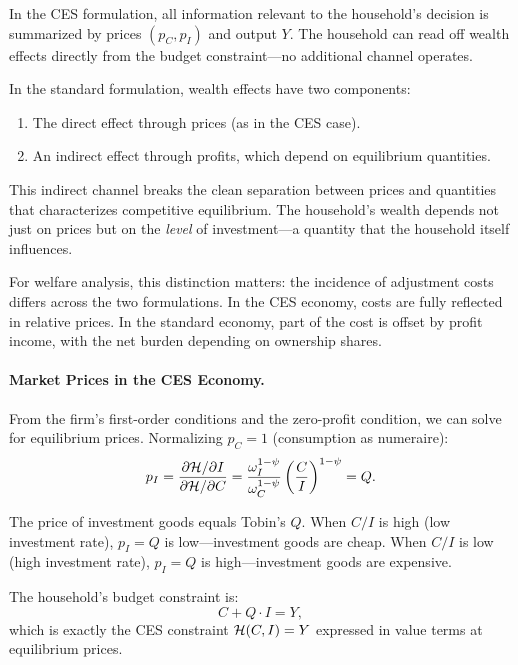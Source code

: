 \begin{calloutimportant}
In the CES formulation, all information relevant to the household's decision is summarized by prices $(p_C, p_I)$ and output $Y$. The household can read off wealth effects directly from the budget constraint---no additional channel operates.

In the standard formulation, wealth effects have two components:
\begin{enumerate}[nosep]
\item The direct effect through prices (as in the CES case).
\item An indirect effect through profits, which depend on equilibrium quantities.
\end{enumerate}

This indirect channel breaks the clean separation between prices and quantities that characterizes competitive equilibrium. The household's wealth depends not just on prices but on the \emph{level} of investment---a quantity that the household itself influences.

For welfare analysis, this distinction matters: the incidence of adjustment costs differs across the two formulations. In the CES economy, costs are fully reflected in relative prices. In the standard economy, part of the cost is offset by profit income, with the net burden depending on ownership shares.
\end{calloutimportant}

\paragraph{Market Prices in the CES Economy.}
From the firm's first-order conditions and the zero-profit condition, we can solve for equilibrium prices. Normalizing $p_C = 1$ (consumption as numeraire):
\begin{equation}
p_I = \frac{\partial \mathcal{H} / \partial I}{\partial \mathcal{H} / \partial C} = \frac{\omega_I^{1-\psi}}{\omega_C^{1-\psi}} \left( \frac{C}{I} \right)^{1-\psi} = Q.
\label{eq:ac-p-I}
\end{equation}

The price of investment goods equals Tobin's $Q$. When $C/I$ is high (low investment rate), $p_I = Q$ is low---investment goods are cheap. When $C/I$ is low (high investment rate), $p_I = Q$ is high---investment goods are expensive.

The household's budget constraint is:
\begin{equation}
C + Q \cdot I = Y,
\label{eq:ac-hh-budget}
\end{equation}
which is exactly the CES constraint $\mathcal{H}(C, I) = Y$ expressed in value terms at equilibrium prices.

